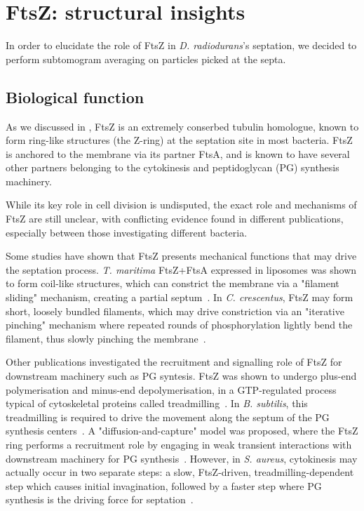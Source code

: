 \chapter{FtsZ: structural insights}

In order to elucidate the role of FtsZ in \textit{D. radiodurans}'s septation, we decided to perform subtomogram averaging on particles picked at the septa.

\section{Biological function}

As we discussed in , FtsZ is an extremely conserbed tubulin homologue, known to form ring-like structures (the Z-ring) at the septation site in most bacteria.
FtsZ is anchored to the membrane via its partner FtsA, and is known to have several other partners belonging to the cytokinesis and peptidoglycan (PG) synthesis machinery.

While its key role in cell division is undisputed, the exact role and mechanisms of FtsZ are still unclear, with conflicting evidence found in different publications, especially between those investigating different bacteria.

Some studies have shown that FtsZ presents mechanical functions that may drive the septation process.
\textit{T. maritima} FtsZ+FtsA expressed in liposomes was shown to form coil-like structures, which can constrict the membrane via a "filament sliding" mechanism, creating a partial septum~\cite{szwedziakArchitectureRingFormed2014}.
In \textit{C. crescentus}, FtsZ may form short, loosely bundled filaments, which may drive constriction via an "iterative pinching" mechanism where repeated rounds of phosphorylation lightly bend the filament, thus slowly pinching the membrane~\cite{liStructureFtsZFilaments2007}.

Other publications investigated the recruitment and signalling role of FtsZ for downstream machinery such as PG syntesis.
FtsZ was shown to undergo plus-end polymerisation and minus-end depolymerisation, in a GTP-regulated process typical of cytoskeletal proteins called treadmilling~\cite{looseBacterialCellDivision2014}.
In \textit{B. subtilis}, this treadmilling is required to drive the movement along the septum of the PG synthesis centers~\cite{bisson-filhoTreadmillingFtsZFilaments2017}.
A "diffusion-and-capture" model was proposed, where the FtsZ ring performs a recruitment role by engaging in weak transient interactions with downstream machinery for PG synthesis~\cite{baranovaDiffusionCapturePermits2020}.
However, in \textit{S. aureus}, cytokinesis may actually occur in two separate steps: a slow, FtsZ-driven, treadmilling-dependent step which causes initial invagination, followed by a faster step where PG synthesis is the driving force for septation~\cite{monteiroPeptidoglycanSynthesisDrives2018}.

